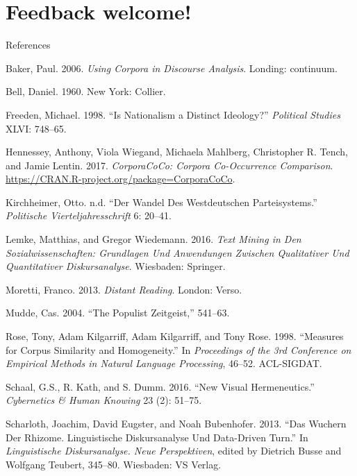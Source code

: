 \documentclass[
  ignorenonframetext,
]{beamer}
\begin{document}
\hypertarget{feedback-welcome}{%
\section{Feedback welcome!}\label{feedback-welcome}}

\begin{frame}{References}
\protect\hypertarget{references}{}

\hypertarget{refs}{}
\leavevmode\hypertarget{ref-Baker2006}{}%
Baker, Paul. 2006. \emph{Using Corpora in Discourse Analysis}. Londing:
continuum.

\leavevmode\hypertarget{ref-Bell1960}{}%
Bell, Daniel. 1960. New York: Collier.

\leavevmode\hypertarget{ref-Freeden1998}{}%
Freeden, Michael. 1998. ``Is Nationalism a Distinct Ideology?''
\emph{Political Studies} XLVI: 748--65.

\leavevmode\hypertarget{ref-CorporaCoCo2017}{}%
Hennessey, Anthony, Viola Wiegand, Michaela Mahlberg, Christopher R.
Tench, and Jamie Lentin. 2017. \emph{CorporaCoCo: Corpora Co-Occurrence
Comparison}. \url{https://CRAN.R-project.org/package=CorporaCoCo}.

\leavevmode\hypertarget{ref-Kirchheimer1965}{}%
Kirchheimer, Otto. n.d. ``Der Wandel Des Westdeutschen Parteisystems.''
\emph{Politische Vierteljahresschrift} 6: 20--41.

\leavevmode\hypertarget{ref-2016TMid}{}%
Lemke, Matthias, and Gregor Wiedemann. 2016. \emph{Text Mining in Den
Sozialwissenschaften: Grundlagen Und Anwendungen Zwischen Qualitativer
Und Quantitativer Diskursanalyse}. Wiesbaden: Springer.

\leavevmode\hypertarget{ref-Moretti2013}{}%
Moretti, Franco. 2013. \emph{Distant Reading}. London: Verso.

\leavevmode\hypertarget{ref-Mudde2004}{}%
Mudde, Cas. 2004. ``The Populist Zeitgeist,'' 541--63.

\leavevmode\hypertarget{ref-Rose98measuresfor}{}%
Rose, Tony, Adam Kilgarriff, Adam Kilgarriff, and Tony Rose. 1998.
``Measures for Corpus Similarity and Homogeneity.'' In \emph{Proceedings
of the 3rd Conference on Empirical Methods in Natural Language
Processing}, 46--52. ACL-SIGDAT.

\leavevmode\hypertarget{ref-Schaal2016}{}%
Schaal, G.S., R. Kath, and S. Dumm. 2016. ``New Visual Hermeneutics.''
\emph{Cybernetics \& Human Knowing} 23 (2): 51--75.

\leavevmode\hypertarget{ref-Rhizome2013}{}%
Scharloth, Joachim, David Eugster, and Noah Bubenhofer. 2013. ``Das
Wuchern Der Rhizome. Linguistische Diskursanalyse Und Data-Driven
Turn.'' In \emph{Linguistische Diskursanalyse. Neue Perspektiven},
edited by Dietrich Busse and Wolfgang Teubert, 345--80. Wiesbaden: VS
Verlag.


\end{frame}
\end{document}
